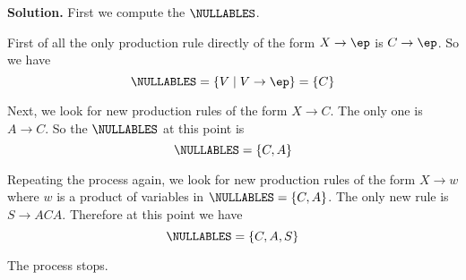 \textbf{Solution.}
First we compute the $\NULLABLES$.
\begin{tightlist}
\item First of all the only production rule directly of the form 
$X \rightarrow \ep$ is 
$C \rightarrow \ep$.
So we have
\[
\NULLABLES = \{V \mid V\rightarrow \ep \} = \{C\}
\]
\item Next, we look for new production rules of the form $X \rightarrow C$.
The only one is $A \rightarrow C$.
So the $\NULLABLES$ at this point is
\[
\NULLABLES = \{C, A\}
\]
\item Repeating the process again, we look for new production rules of the
form $X \rightarrow w$ where $w$ is a product of
variables in 
$\NULLABLES = \{C, A\}$. The only new rule is $S \rightarrow ACA$.
Therefore at this point we have
\[
\NULLABLES = \{C, A, S\}
\]
\item The process stops.
\end{tightlist}

